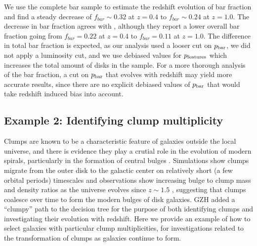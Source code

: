 \documentclass[twocolumn]{aastex6}
\begin{document}
We use the complete bar sample to estimate the redshift evolution of bar fraction and find a steady decrease of $f_{bar} \sim 0.32$ at $z=0.4$ to $f_{bar} \sim 0.24$ at $z=1.0$. The decrease in bar fraction agrees with \citet{mel14}, although they report a lower overall bar fraction going from $f_{bar}=0.22$ at $z=0.4$ to $f_{bar}=0.11$ at $z=1.0$. The difference in total bar fraction is expected, as our analysis used a looser cut on $p_{\rm bar}$, we did not apply a luminosity cut, and we use debiased values for $p_{\rm features}$ which increases the total amount of disks in the sample. For a more thorough analysis of the bar fraction, a cut on $p_{\rm bar}$ that evolves with redshift may yield more accurate results, since there are no explicit debiased values of $p_{\rm bar}$ that would take redshift induced bias into account. 

\subsection{Example 2: Identifying clump multiplicity}
Clumps are known to be a characteristic feature of galaxies outside the local universe, and there is evidence they play a crutial role in the evolution of modern spirals, particularly in the formation of central bulges \citep{elm05,elm14,guo15,beh16}. Simulations show clumps migrate from the outer disk to the galactic center on relatively short (a few orbital periods) timescales \citep{man15} and observations show increasing bulge to clump mass and density ratios as the universe evolves since $z\sim 1.5$ \citep{elm09}, suggesting that clumps coalesce over time to form the modern bulges of disk galaxies. GZH added a ``clumpy'' path to the decision tree for the purpose of both identifying clumps and investigating their evolution with redshift. Here we provide an example of how to select galaxies with particular clump multiplicities, for investigations related to the transformation of clumps as galaxies continue to form. 
\end{document}
